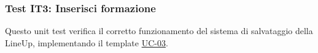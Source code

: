 \begin{comment}
	entityManager.getTransaction().begin();
		
	FantaUser user1 = new FantaUser("user1@test.com", "pwd");
	fantaUserRepository.saveFantaUser(user1);
	FantaUser user2 = new FantaUser("user2@test.com", "pwd");
	fantaUserRepository.saveFantaUser(user2);
		
	NewsPaper newsPaper = new NewsPaper("Gazzetta");
	newspaperRepository.saveNewsPaper(newsPaper);
		
	League league = new League(user1, "Test League", newsPaper, "1234");
	leagueRepository.saveLeague(league);
		
	FantaTeam team1 = new FantaTeam("Team A", league, 0, user1, new HashSet<Contract>());
	fantaTeamRepository.saveTeam(team1);
	FantaTeam team2 = new FantaTeam("Team B", league, 0, user2, new HashSet<Contract>());
	fantaTeamRepository.saveTeam(team2);
		
	MatchDaySerieA day1 = new MatchDaySerieA("MD1", LocalDate.of(2025, 9, 7));
	matchDayRepository.saveMatchDay(day1);
		
	Match m1 = new Match(day1, team1, team2);
	matchRepository.saveMatch(m1);
		
	entityManager.getTransaction().commit();
		
	Map<MatchDaySerieA, List<Match>> result = userService.getAllMatches(league);		
		
	assertThat(result.get(day1).size()).isEqualTo(1);
	Match resultMatch = result.get(day1).get(0);
		
	assertThat(resultMatch.getMatchDaySerieA().getName()).isEqualTo("MD1");
}
\end{lstlisting}

\end{comment}

\subsubsection{Test IT3: Inserisci formazione} \label{IT3}

Questo unit test verifica il corretto funzionamento del sistema di salvataggio della LineUp,
implementando il template \hyperref[UC-03]{UC-03}.

